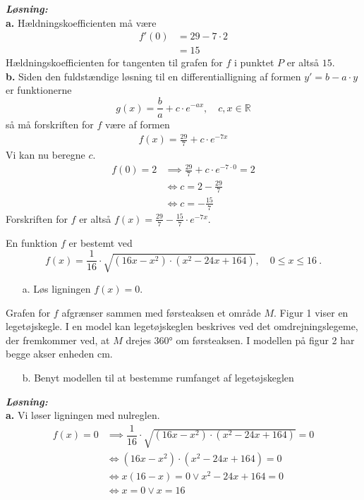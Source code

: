 \documentclass{article}
\newcommand{\sol}{\setlength{\parindent}{0cm}\textbf{\textit{Løsning:}}\setlength{\parindent}{1cm}}
\begin{document}
\sol \\
\textbf{a.}
Hældningskoefficienten må være
\begin{equation*}
\begin{split}
  f'(0)&=29-7 \cdot 2\\ 
  &=15
\end{split}
\end{equation*}
Hældningskoefficienten for tangenten til grafen for $f$ i punktet $P$ er altså $15$. \\[1ex]
\textbf{b.}
Siden den fuldstændige løsning til en differentialligning af formen $y'=b-a \cdot y$ er funktionerne 
\[
g(x)=\frac{b}{a}+c \cdot e^{-ax}, \quad c,x \in \mathbb{R}
\] 
så må forskriften for $f$ være af formen
\begin{equation*}
\begin{split}
f(x)= \frac{29}{7}+c \cdot e^{-7x} 
\end{split}
\end{equation*}
Vi kan nu beregne $c$.
\begin{equation*}
\begin{split}
  f(0)= 2 &\implies \frac{29}{7}+ c \cdot e^{-7 \cdot 0} =2\\ 
  &\iff c=2-\frac{29}{7}\\ 
  &\iff c=-\frac{15}{7}
\end{split}
\end{equation*}
Forskriften for $f$ er altså $f(x)= \frac{29}{7}-\frac{15}{7} \cdot e^{-7x} $. 
\begin{question}{}{}
En funktion $f$ er bestemt ved $$f(x)=\dfrac{1}{16}\cdot\sqrt{(16x-x^2)\cdot(x^2-24x+164)},\quad0\leq x\leq16\:.$$
\begin{itemize}
  \item[a.] Løs ligningen $f(x) = 0$.
\end{itemize}
Grafen for $f$ afgrænser sammen med førsteaksen et område $M.$
Figur 1 viser en legetøjskegle. I en model kan legetøjskeglen beskrives ved det
omdrejningslegeme, der fremkommer ved, at $M$ drejes 360° om førsteaksen.
I modellen på figur 2 har begge akser enheden cm.
\begin{itemize}
  \item[b.] Benyt modellen til at bestemme rumfanget af legetøjskeglen
\end{itemize}
\end{question}
\sol \\
\textbf{a.}
Vi løser ligningen med nulreglen.
\begin{equation*}
\begin{split}
  f(x)= 0 &\implies \dfrac{1}{16}\cdot\sqrt{(16x-x^2)\cdot(x^2-24x+164)} =0\\ 
  &\iff (16x-x^2)\cdot(x^2-24x+164)=0\\ 
  &\iff x(16-x)=0 \lor x^2-24x+164=0\\ 
  &\iff x=0 \lor x=16
\end{split}
\end{equation*}
\end{document}
